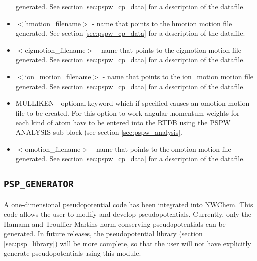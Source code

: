 \begin{itemize}
                                generated. See section \ref{sec:pspw_cp_data} for a 
                                description of the datafile.
        \item $<$hmotion\_filename$>$ - name that points to the hmotion motion file
                                generated. See section \ref{sec:pspw_cp_data} for a 
                                description of the datafile.
        \item $<$eigmotion\_filename$>$ - name that points to the eigmotion motion file
                                generated. See section \ref{sec:pspw_cp_data} for a 
                                description of the datafile.
        \item $<$ion\_motion\_filename$>$ - name that points to the ion\_motion motion file
                                generated. See section \ref{sec:pspw_cp_data} for a 
                                description of the datafile.
       \item MULLIKEN - optional keyword which if specified
                         causes an omotion motion file to be created.  For this option
                         to work angular momentum weights for each kind
                         of atom have to be entered into the RTDB using
                         the PSPW ANALYSIS sub-block (see section \ref{sec:pspw_analysis}.
        \item $<$omotion\_filename$>$ - name that points to the omotion motion file
                                generated. See section \ref{sec:pspw_cp_data} for a 
                                description of the datafile.
\end{itemize}


\subsection{\tt PSP\_GENERATOR}
\label{sec:pspw_psp_generator}
A one-dimensional pseudopotential code has been integrated into NWChem.
This code allows the user to modify and develop pseudopotentials.  Currently, 
only the Hamann and Troullier-Martins norm-conserving pseudopotentials can be
generated.  In future releases, the pseudopotential library (section \ref{sec:psp_library})
will be more complete, so that the user will not have explicitly generate
pseudopotentials using this module.

